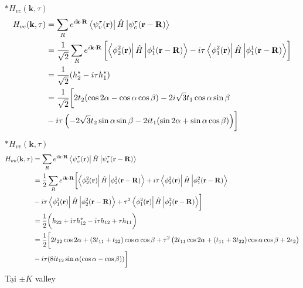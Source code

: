 \documentclass{report}
\newcommand{\f}[2]{\dfrac{#1}{#2}}
\begin{document}
$\ast H_{vc}(\mathbf{k},\tau)$
\begin{align*}
	H_{vc}(\mathbf{k},\tau)
	 & = \sum_{R} e^{i\mathbf{k\cdot R}}\bra{\psi_{v}^{\mathfrak{\tau}}(\mathbf{r})}\hat{H}\ket{\mathcal{\psi}_{c}^{\tau}(\mathbf{r - R})}                                                                 \\
	 & = \f{1}{\sqrt{2}}\sum_{R} e^{i\mathbf{k\cdot R}}\left[ \bra{\phi^2_2(\mathbf{r})} \hat{H} \ket{\phi^1_1(\mathbf{r-R})} - i\tau\bra{\phi^2_1(\mathbf{r})}\hat{H}\ket{\phi^1_1(\mathbf{r-R})} \right] \\
	 & = \f{1}{\sqrt{2}} (h_2^{\ast} - i\tau h_1^{\ast})                                                                                                                                                   \\
	 & = \frac{1}{\sqrt{2}} \biggl[ 2t_2 (\cos 2\alpha -\cos\alpha\cos\beta ) - 2i\sqrt{3}t_1\cos\alpha\sin\beta                                                                                           \\
	 & - i\tau \left(-2\sqrt{3} t_2 \sin\alpha \sin\beta - 2i t_1(\sin2\alpha + \sin\alpha \cos\beta )\right) \biggr]
\end{align*}

$\ast H_{vv}(\mathbf{k},\tau)$
\begin{align*}
	H_{vv}(\mathbf{k},\tau)
	 & = \sum_{R} e^{i\mathbf{k\cdot R}}\bra{\psi_{v}^{\mathfrak{\tau}}(\mathbf{r})}\hat{H}\ket{\mathcal{\psi}_{v}^{\tau}(\mathbf{r - R})}                                                           \\
	 & = \f{1}{2}\sum_{R} e^{i\mathbf{k\cdot R}} \biggl[ \bra{\phi^2_2(\mathbf{r})} \hat{H} \ket{\phi^2_2(\mathbf{r-R})} + i\tau\bra{\phi^2_2(\mathbf{r})}\hat{H}\ket{\phi^2_1(\mathbf{r-R})}        \\
	 & - i\tau \bra{\phi^2_1(\mathbf{r})}\hat{H}\ket{\phi^2_2(\mathbf{r-R})} + \tau^2 \bra{\phi^2_1(\mathbf{r})}\hat{H}\ket{\phi^2_1(\mathbf{r-R})} \biggr]                                          \\
	 & = \f{1}{2} \biggl( h_{22} + i\tau h_{12}^{\ast} - i\tau h_{12} + \tau h_{11}   \biggr)                                                                                                        \\
	 & = \f{1}{2} \biggl[ 2 t_{22} \cos2\alpha  + (3t_{11} + t_{22})\cos\alpha \cos\beta + \tau^2 \left(2t_{11}\cos2\alpha + \left (t_{11} + 3t_{22}\right )\cos\alpha\cos\beta + 2\epsilon_2\right) \\
	 & - i\tau (8i t_{12}\sin\alpha(\cos\alpha - \cos\beta)) \biggr]
\end{align*}
Tại $\pm K$ valley
\end{document}
